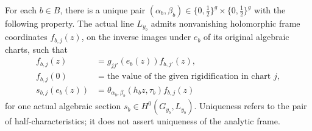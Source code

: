 \begin{lemma}
\label{lem:ftb-actual-half-characteristic}
For each \(b\in B\), there is a unique pair
\((\alpha_b,\beta_b)\in\{0,\tfrac12\}^g\times
\{0,\tfrac12\}^g\) with the following property.
The actual line \(L_{y_b}\) admits nonvanishing holomorphic
frame coordinates \(f_{b,j}(z)\), on the inverse images under
\(e_b\) of its original algebraic charts, such that
\[
 \begin{split}
 f_{b,j}(z)&=g_{jj'}(e_b(z))f_{b,j'}(z),\\
 f_{b,j}(0)&=\text{the value of the given rigidification
                       in chart \(j\)},\\
 s_{b,j}(e_b(z))&=
       \theta_{\alpha_b,\beta_b}(h_bz,\tau_b)f_{b,j}(z)
 \end{split}
 \tag{TF3}\label{eq:ftb-actual-family-theta-frame}
\]
for one actual algebraic section \(s_b\in H^0(G_{y_b},L_{y_b})\).
Uniqueness refers to the pair of half-characteristics; it does
not assert uniqueness of the analytic frame.
\end{lemma}

